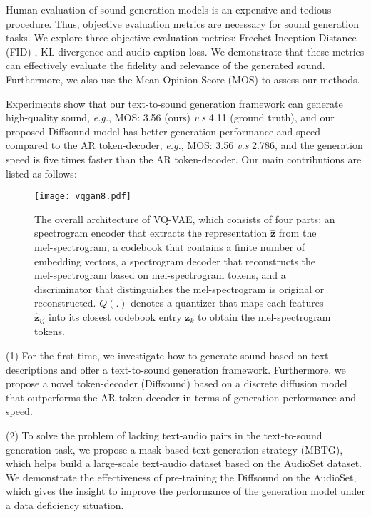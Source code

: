 \documentclass[lettersize,journal]{IEEEtran}
\begin{document}
Human evaluation of sound generation models is an expensive and tedious procedure. Thus, objective evaluation metrics are necessary for sound generation tasks. We explore three objective evaluation metrics: Frechet Inception Distance (FID) \cite{heusel2017gans}, KL-divergence \cite{iashin2021taming} and audio caption loss. We demonstrate that these metrics can effectively evaluate the fidelity and relevance of the generated sound. Furthermore, we also use the Mean Opinion Score (MOS) to assess our methods. 

Experiments show that our text-to-sound generation framework can generate high-quality sound, \textit{e.g.}, MOS: 3.56 (ours) \textit{v.s} 4.11 (ground truth), and our proposed Diffsound model has better generation performance and speed compared to the AR token-decoder, \textit{e.g.}, MOS: 3.56 \textit{v.s} 2.786, and the generation speed is five times faster than the AR token-decoder. Our main contributions are listed as follows:
\begin{figure}[t]
  \centering
  \texttt{[image: vqgan8.pdf]}
  \caption{The overall architecture of VQ-VAE, which consists of four parts: an spectrogram encoder that extracts the representation $\boldsymbol{\hat{z}}$ from the mel-spectrogram, a codebook that contains a finite number of embedding vectors, a spectrogram decoder that reconstructs the mel-spectrogram based on mel-spectrogram tokens, and a discriminator that distinguishes the mel-spectrogram is original or reconstructed. $Q(.)$ denotes a quantizer that maps each features $\boldsymbol{\hat{z}}_{ij}$ into its closest codebook entry $\boldsymbol{z}_k$ to obtain the mel-spectrogram tokens.}
  \label{fig:gan}
  \vspace*{-\baselineskip}
\end{figure}

(1) For the first time, we investigate how to generate sound based on text descriptions and offer a text-to-sound generation framework. Furthermore, we propose a novel token-decoder (Diffsound) based on a discrete diffusion model that outperforms the AR token-decoder in terms of generation performance and speed.

(2) To solve the problem of lacking text-audio pairs in the text-to-sound generation task, we propose a mask-based text generation strategy (MBTG), which helps build a large-scale text-audio dataset based on the AudioSet dataset. We demonstrate the effectiveness of pre-training the Diffsound on the AudioSet, which gives the insight to improve the performance of the generation model under a data deficiency situation.
\end{document}
